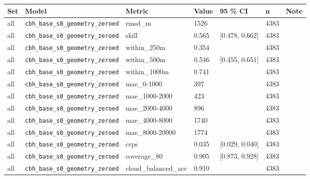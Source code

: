 \begin{center}{\scriptsize\setlength{\tabcolsep}{3pt}
\begin{tabular}{lp{2.4cm}llllp{7.3cm}}
\toprule
Set & Model & Metric & Value & 95 \% CI & n & Note \\
\midrule
all & \texttt{cbh\_\allowbreak{}base\_\allowbreak{}s0\_\allowbreak{}geometry\_\allowbreak{}zeroed} & rmsd\_m & 1526 &  & 4383 &  \\
all & \texttt{cbh\_\allowbreak{}base\_\allowbreak{}s0\_\allowbreak{}geometry\_\allowbreak{}zeroed} & skill & 0.565 & [0.478, 0.662] & 4383 &  \\
all & \texttt{cbh\_\allowbreak{}base\_\allowbreak{}s0\_\allowbreak{}geometry\_\allowbreak{}zeroed} & within\_250m & 0.354 &  & 4383 &  \\
all & \texttt{cbh\_\allowbreak{}base\_\allowbreak{}s0\_\allowbreak{}geometry\_\allowbreak{}zeroed} & within\_500m & 0.546 & [0.455, 0.651] & 4383 &  \\
all & \texttt{cbh\_\allowbreak{}base\_\allowbreak{}s0\_\allowbreak{}geometry\_\allowbreak{}zeroed} & within\_1000m & 0.741 &  & 4383 &  \\
all & \texttt{cbh\_\allowbreak{}base\_\allowbreak{}s0\_\allowbreak{}geometry\_\allowbreak{}zeroed} & mae\_0-1000 & 397 &  & 4383 &  \\
all & \texttt{cbh\_\allowbreak{}base\_\allowbreak{}s0\_\allowbreak{}geometry\_\allowbreak{}zeroed} & mae\_1000-2000 & 423 &  & 4383 &  \\
all & \texttt{cbh\_\allowbreak{}base\_\allowbreak{}s0\_\allowbreak{}geometry\_\allowbreak{}zeroed} & mae\_2000-4000 & 896 &  & 4383 &  \\
all & \texttt{cbh\_\allowbreak{}base\_\allowbreak{}s0\_\allowbreak{}geometry\_\allowbreak{}zeroed} & mae\_4000-8000 & 1740 &  & 4383 &  \\
all & \texttt{cbh\_\allowbreak{}base\_\allowbreak{}s0\_\allowbreak{}geometry\_\allowbreak{}zeroed} & mae\_8000-20000 & 1774 &  & 4383 &  \\
all & \texttt{cbh\_\allowbreak{}base\_\allowbreak{}s0\_\allowbreak{}geometry\_\allowbreak{}zeroed} & crps & 0.035 & [0.029, 0.040] & 4383 &  \\
all & \texttt{cbh\_\allowbreak{}base\_\allowbreak{}s0\_\allowbreak{}geometry\_\allowbreak{}zeroed} & coverage\_80 & 0.905 & [0.873, 0.928] & 4383 &  \\
all & \texttt{cbh\_\allowbreak{}base\_\allowbreak{}s0\_\allowbreak{}geometry\_\allowbreak{}zeroed} & cloud\_balanced\_acc & 0.910 &  & 4383 &  \\

\end{tabular}}
\end{center}
